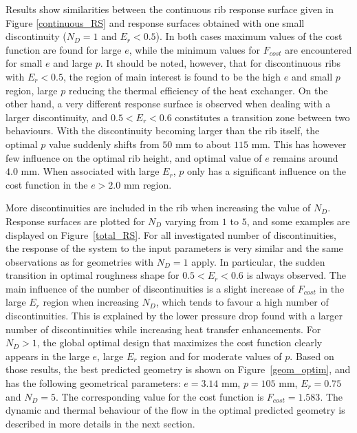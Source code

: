 Results show similarities between the continuous rib response surface given in Figure \ref{continuous_RS} and response surfaces obtained with one small discontinuity ($N_D=1$ and $E_r < 0.5$). In both cases maximum values of the cost function are found for large $e$, while the minimum values for $F_{cost}$ are encountered for small $e$ and large $p$. It should be noted, however, that for discontinuous ribs with $E_r < 0.5$, the region of main interest is found to be the high $e$ and small $p$ region, large $p$ reducing the thermal efficiency of the heat exchanger. On the other hand, a very different response surface is observed when dealing with a larger discontinuity, and $0.5 < E_r < 0.6$ constitutes a transition zone between two behaviours. With the discontinuity becoming larger than the rib itself, the optimal $p$ value suddenly shifts from $50$ mm to about $115$ mm. This has however few influence on the optimal rib height, and optimal value of $e$ remains around $4.0$ mm. When associated with large $E_r$, $p$ only has a significant influence on the cost function in the $e > 2.0$ mm region.

More discontinuities are included in the rib when increasing the value of $N_D$. Response surfaces are plotted for $N_D$ varying from $1$ to $5$, and some examples are displayed on Figure~\ref{total_RS}. For all investigated number of discontinuities, the response of the system to the input parameters is very similar and the same observations as for geometries with $N_D=1$ apply. In particular, the sudden transition in optimal roughness shape for $0.5 < E_r < 0.6$ is always observed. The main influence of the number of discontinuities is a slight increase of $F_{cost}$ in the large $E_r$ region when increasing $N_D$, which tends to favour a high number of discontinuities. This is explained by the lower pressure drop found with a larger number of discontinuities while increasing heat transfer enhancements. For $N_D > 1$, the global optimal design that maximizes the cost function clearly appears in the large $e$, large $E_r$ region and for moderate values of $p$. Based on those results, the best predicted geometry is shown on Figure~\ref{geom_optim}, and has the following geometrical parameters: $e=3.14$ mm, $p=105$ mm, $E_r=0.75$ and $N_D=5$. The corresponding value for the cost function is $F_{cost}=1.583$. The dynamic and thermal behaviour of the flow in the optimal predicted geometry is described in more details in the next section.

